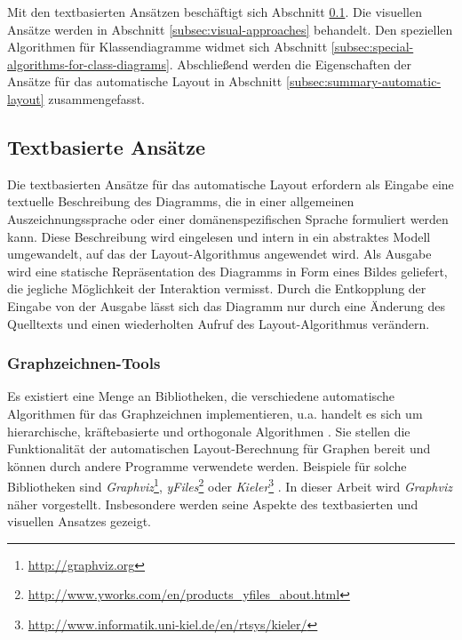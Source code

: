 Mit den textbasierten Ansätzen beschäftigt sich Abschnitt \ref{subsec:text-based-approaches}. Die visuellen Ansätze werden in Abschnitt \ref{subsec:visual-approaches} behandelt. Den speziellen Algorithmen für Klassendiagramme widmet sich Abschnitt \ref{subsec:special-algorithms-for-class-diagrams}. Abschließend werden die Eigenschaften der Ansätze für das automatische Layout in Abschnitt \ref{subsec:summary-automatic-layout} zusammengefasst.

\subsection{Textbasierte Ansätze}
\label{subsec:text-based-approaches}

Die textbasierten Ansätze für das automatische Layout erfordern als Eingabe eine textuelle Beschreibung des Diagramms, die in einer allgemeinen Auszeichnungssprache oder einer domänenspezifischen Sprache formuliert werden kann. Diese Beschreibung wird eingelesen und intern in ein abstraktes Modell umgewandelt, auf das der Layout-Algorithmus angewendet wird. Als Ausgabe wird eine statische Repräsentation des Diagramms in Form eines Bildes geliefert, die jegliche Möglichkeit der Interaktion vermisst. Durch die Entkopplung der Eingabe von der Ausgabe lässt sich das Diagramm nur durch eine Änderung des Quelltexts und einen wiederholten Aufruf des Layout-Algorithmus verändern.

\subsubsection{Graphzeichnen-Tools}
\label{subsubsec:graph-drawing-tools}

Es existiert eine Menge an Bibliotheken, die verschiedene automatische Algorithmen für das Graphzeichnen implementieren, u.a. handelt es sich um hierarchische, kräftebasierte und orthogonale Algorithmen \cite{Maier12A-Pattern-based}. Sie stellen die Funktionalität der automatischen Layout-Be\-rech\-nung für Graphen bereit und können durch andere Programme verwendete werden.  Beispiele für solche Bibliotheken sind \textit{Graphviz}\footnote{\url{http://graphviz.org}}, \textit{yFiles}\footnote{\url{http://www.yworks.com/en/products_yfiles_about.html}} oder \textit{Kieler}\footnote{\url{http://www.informatik.uni-kiel.de/en/rtsys/kieler/}} \cite{Maier12A-Pattern-based}. In dieser Arbeit wird \textit{Graphviz} näher vorgestellt. Insbesondere werden seine Aspekte des textbasierten und visuellen Ansatzes gezeigt.


